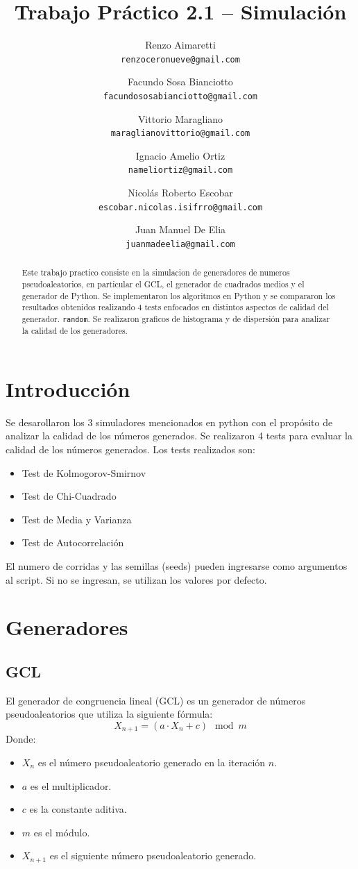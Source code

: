 \documentclass{article}
\title{Trabajo Práctico 2.1 -- Simulación}
\author{
    Renzo Aimaretti \\ \texttt{renzoceronueve@gmail.com}
    \and
    Facundo Sosa Bianciotto \\ \texttt{facundososabianciotto@gmail.com}
    \and
    Vittorio Maragliano \\ \texttt{maraglianovittorio@gmail.com}
    \and
    Ignacio Amelio Ortiz \\ \texttt{nameliortiz@gmail.com}
    \and
    Nicolás Roberto Escobar \\ \texttt{escobar.nicolas.isifrro@gmail.com}
    \and
    Juan Manuel De Elia \\ \texttt{juanmadeelia@gmail.com}
}
\begin{document}
\maketitle
\begin{abstract}
    Este trabajo practico consiste en la simulacion de generadores de numeros pseudoaleatorios, en particular el GCL, el generador de cuadrados medios y el generador de Python. Se implementaron los algoritmos en Python y se compararon los resultados obtenidos realizando 4 tests enfocados en distintos aspectos de calidad del generador. \texttt{random}. Se realizaron graficos de histograma y de dispersión para analizar la calidad de los generadores. 
\end{abstract}

\section{Introducción}
Se desarollaron los 3 simuladores mencionados en python con el propósito de analizar la calidad de los números generados. Se realizaron 4 tests para evaluar la calidad de los números generados. Los tests realizados son:
\begin{itemize}
    \item Test de Kolmogorov-Smirnov
    \item Test de Chi-Cuadrado
    \item Test de Media y Varianza
    \item Test de Autocorrelación
\end{itemize}
El numero de corridas y las semillas (seeds) pueden ingresarse como argumentos al script. Si no se ingresan, se utilizan los valores por defecto.

\section{Generadores}
\subsection{GCL}
El generador de congruencia lineal (GCL) es un generador de números pseudoaleatorios que utiliza la siguiente fórmula:
\begin{equation}
    X_{n+1} = (a \cdot X_n + c) \mod m
\end{equation}
Donde:
\begin{itemize}
    \item $X_n$ es el número pseudoaleatorio generado en la iteración $n$.
    \item $a$ es el multiplicador.
    \item $c$ es la constante aditiva.
    \item $m$ es el módulo.
    \item $X_{n+1}$ es el siguiente número pseudoaleatorio generado.
\end{itemize}
\end{document}

